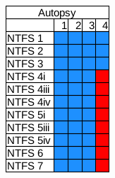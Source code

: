 \begin{figure}[h]
    \centering

    \begin{subfigure}{0.17\linewidth}
        \includegraphics[width=\linewidth]{fig/autopsy_results_ntfs.png}
    \end{subfigure}~~
    \begin{subfigure}{0.17\linewidth}

\end{subfigure}
\end{figure}
